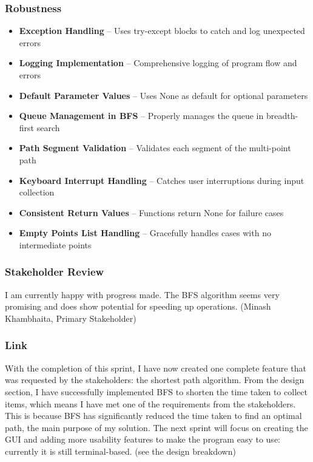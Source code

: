 \subsubsection{Robustness}
\begin{itemize}
    \item \textbf{Exception Handling} -- Uses try-except blocks to catch and log unexpected errors
    \item \textbf{Logging Implementation} -- Comprehensive logging of program flow and errors
    \item \textbf{Default Parameter Values} -- Uses None as default for optional parameters
    \item \textbf{Queue Management in BFS} -- Properly manages the queue in breadth-first search
    \item \textbf{Path Segment Validation} -- Validates each segment of the multi-point path
    \item \textbf{Keyboard Interrupt Handling} -- Catches user interruptions during input collection
    \item \textbf{Consistent Return Values} -- Functions return None for failure cases
    \item \textbf{Empty Points List Handling} -- Gracefully handles cases with no intermediate points
\end{itemize}

\subsubsection{Stakeholder Review}

I am currently happy with progress made. The BFS algorithm seems very promising and does show potential for speeding up operations. (Minash Khambhaita, Primary Stakeholder)

\subsubsection{Link}

With the completion of this sprint, I have now created one complete feature that was requested by the stakeholders: the shortest path algorithm. From the design section, I have successfully implemented BFS to shorten the time taken to collect items, which means I have met one of the requirements from the stakeholders. This is because BFS has significantly reduced the time taken to find an optimal path, the main purpose of my solution. \newline The next sprint will focus on creating the GUI and adding more usability features to make the program easy to use: currently it is still terminal-based. (see the design breakdown)


